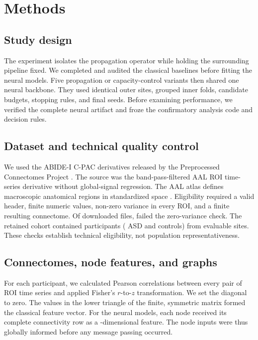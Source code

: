 \section{Methods}

\subsection{Study design}

The experiment isolates the propagation operator while holding the surrounding
pipeline fixed. We completed and audited the classical baselines before fitting
the neural models. Five propagation or capacity-control variants then shared
one neural backbone. They used identical outer sites, grouped inner folds,
candidate budgets, stopping rules, and final seeds. Before examining
performance, we verified the complete neural artifact and froze the
confirmatory analysis code and decision rules.

\subsection{Dataset and technical quality control}

We used the ABIDE-I C-PAC derivatives released by the Preprocessed Connectomes
Project \cite{dimartino2014abide,abidepcp}. The source was the
band-pass-filtered AAL ROI time-series derivative without global-signal
regression.
The AAL atlas defines macroscopic anatomical regions in standardized space
\cite{tzourio2002aal}. Eligibility required a valid header, finite numeric
values, non-zero variance in every ROI, and a finite resulting connectome. Of
\StudyParentRows{} downloaded files, \StudyTechnicalExclusions{} failed the
zero-variance check. The retained cohort contained
\StudyParticipants{} participants (\StudyASD{} ASD and \StudyControls{}
controls) from \StudySites{} evaluable sites. These checks establish technical
eligibility, not population representativeness.



\subsection{Connectomes, node features, and graphs}

For each participant, we calculated Pearson correlations between every pair of
\StudyROIs{} ROI time series and applied Fisher's $r$-to-$z$ transformation.
We set the diagonal to zero. The \StudyEdges{} values in the lower triangle of
the finite, symmetric matrix formed the classical feature vector. For the
neural models, each node received its complete connectivity row as a
\StudyROIs{}-dimensional feature. The node inputs were thus globally informed
before any message passing occurred.

